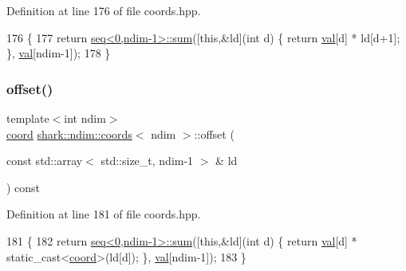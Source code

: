Definition at line 176 of file coords.\+hpp.


\begin{DoxyCode}
176                                                                         \{
177             \textcolor{keywordflow}{return} \hyperlink{namespaceshark_1_1ndim_a864213068a08615fa12bdd67d83ed324}{seq<0,ndim-1>::sum}([\textcolor{keyword}{this},&ld](\textcolor{keywordtype}{int} d) \{ \textcolor{keywordflow}{return} 
      \hyperlink{structshark_1_1ndim_1_1coords_a425262af388367b0f0079218e038aef5}{val}[d] * ld[d+1]; \}, \hyperlink{structshark_1_1ndim_1_1coords_a425262af388367b0f0079218e038aef5}{val}[ndim-1]);
178         \}
\end{DoxyCode}
\hypertarget{structshark_1_1ndim_1_1coords_a9db29c2f1cddc01f6deb07fe5dc72476}{}\label{structshark_1_1ndim_1_1coords_a9db29c2f1cddc01f6deb07fe5dc72476} 
\subsubsection{\texorpdfstring{offset()}{offset()}\hspace{0.1cm}{\footnotesize\ttfamily [2/2]}}
{\footnotesize\ttfamily template$<$int ndim$>$ \\
\hyperlink{namespaceshark_a767a92d5dd82cb82266473bff42fa6d9}{coord} \hyperlink{structshark_1_1ndim_1_1coords}{shark\+::ndim\+::coords}$<$ ndim $>$\+::offset (\begin{DoxyParamCaption}\item[{const std\+::array$<$ std\+::size\+\_\+t, ndim-\/1 $>$ \&}]{ld }\end{DoxyParamCaption}) const\hspace{0.3cm}{\ttfamily [inline]}}



Definition at line 181 of file coords.\+hpp.


\begin{DoxyCode}
181                                                                                     \{
182             \textcolor{keywordflow}{return} \hyperlink{namespaceshark_1_1ndim_a864213068a08615fa12bdd67d83ed324}{seq<0,ndim-1>::sum}([\textcolor{keyword}{this},&ld](\textcolor{keywordtype}{int} d) \{ \textcolor{keywordflow}{return} 
      \hyperlink{structshark_1_1ndim_1_1coords_a425262af388367b0f0079218e038aef5}{val}[d] * \textcolor{keyword}{static\_cast<}\hyperlink{namespaceshark_a767a92d5dd82cb82266473bff42fa6d9}{coord}\textcolor{keyword}{>}(ld[d]); \}, \hyperlink{structshark_1_1ndim_1_1coords_a425262af388367b0f0079218e038aef5}{val}[ndim-1]);
183         \}
\end{DoxyCode}
\hypertarget{structshark_1_1ndim_1_1coords_ad2d1e81259a5886bf6e15cd41c018fcc}{}\label{structshark_1_1ndim_1_1coords_ad2d1e81259a5886bf6e15cd41c018fcc} 
